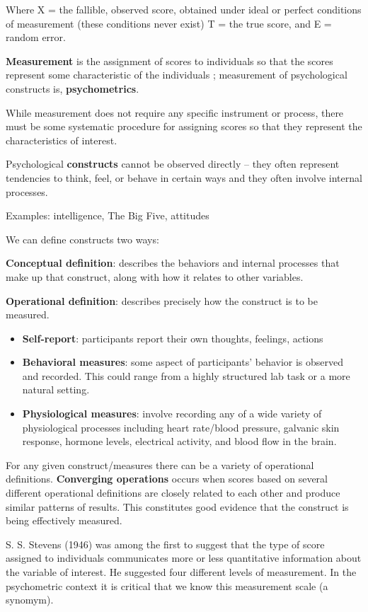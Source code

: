 \documentclass[
  english,
]{book}
\providecommand{\tightlist}{%
  \setlength{\itemsep}{0pt}\setlength{\parskip}{0pt}}
\begin{document}
Where
X = the fallible, observed score, obtained under ideal or perfect conditions of measurement (these conditions never exist)
T = the true score, and
E = random error.

\textbf{Measurement} is the assignment of scores to individuals so that the scores represent some characteristic of the individuals \citep{jhangiani_research_2019}; measurement of psychological constructs is, \textbf{psychometrics}.

While measurement does not require any specific instrument or process, there must be some systematic procedure for assigning scores so that they represent the characteristics of interest.

Psychological \textbf{constructs} cannot be observed directly -- they often represent tendencies to think, feel, or behave in certain ways and they often involve internal processes.

Examples: intelligence, The Big Five, attitudes

We can define constructs two ways:

\textbf{Conceptual definition}: describes the behaviors and internal processes that make up that construct, along with how it relates to other variables.

\textbf{Operational definition}: describes precisely how the construct is to be measured.

\begin{itemize}
\tightlist
\item
  \textbf{Self-report}: participants report their own thoughts, feelings, actions
\item
  \textbf{Behavioral measures}: some aspect of participants' behavior is observed and recorded. This could range from a highly structured lab task or a more natural setting.
\item
  \textbf{Physiological measures}: involve recording any of a wide variety of physiological processes including heart rate/blood pressure, galvanic skin response, hormone levels, electrical activity, and blood flow in the brain.
\end{itemize}

For any given construct/measures there can be a variety of operational definitions. \textbf{Converging operations} occurs when scores based on several different operational definitions are closely related to each other and produce similar patterns of results. This constitutes good evidence that the construct is being effectively measured.

S. S. Stevens (1946) was among the first to suggest that the type of score assigned to individuals communicates more or less quantitative information about the variable of interest. He suggested four different levels of measurement. In the psychometric context it is critical that we know this measurement scale (a synomym).
\end{document}
